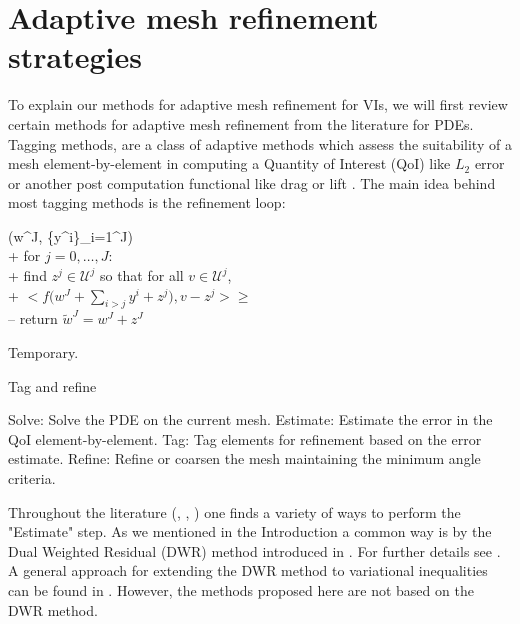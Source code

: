 \documentclass[]{interact}
\theoremstyle{plain}%
\theoremstyle{definition}
\theoremstyle{remark}
\begin{document}
\section{Adaptive mesh refinement strategies} \label{sec:viamr}

To explain our methods for adaptive mesh refinement for VIs, we will first review certain methods for adaptive mesh refinement from the literature for PDEs.  Tagging methods, are a class of adaptive methods which assess the suitability of a mesh element-by-element in computing a Quantity of Interest (QoI) like $L_2$ error or another post computation functional like drag or lift \cite{BangerthRannacher2003}. The main idea behind most tagging methods is the refinement loop:

\begin{algorithm}
\begin{pseudo}
(w^J, \{y^i\}_{i=1}^J)\text{:} \\+
    for $j = 0,\dots,J$: \\+
        \rm{find} $z^j\in \mathcal{U}^j$ \rm{so that for all} $v \in \mathcal{U}^j$, \\+
            $\displaystyle \Big<f\Big(w^J + \sum_{i>j} y^i + z^j\Big),v-z^j\Big> \ge $ \\--
    return $\tilde w^J=w^J + z^J$
\end{pseudo}
\caption{Temporary.}\label{alg:tmp}
\end{algorithm}

\begin{algorithm}
  \caption{Tag and refine}
  \begin{algorithmic}
    \State Solve: Solve the PDE on the current mesh. 
    \State Estimate: Estimate the error in the QoI element-by-element.
    \State Tag: Tag elements for refinement based on the error estimate.
    \State Refine: Refine or coarsen the mesh maintaining the minimum angle criteria.
  \end{algorithmic}
\end{algorithm}

Throughout the literature (\cite{BeckerRannacher2001}, \cite{BangerthRannacher2003}, \cite{Suttmeier2008}) one finds a variety of ways to perform the "Estimate" step. As we mentioned in the Introduction a common way is by the Dual Weighted Residual (DWR) method introduced in \cite{BeckerRannacher2001}. For further details see \cite[Chapter 3]{BangerthRannacher2003}. A general approach for extending the DWR method to variational inequalities can be found in \cite{Suttmeier2008}.  However, the methods proposed here are not based on the DWR method. 
\end{document}

